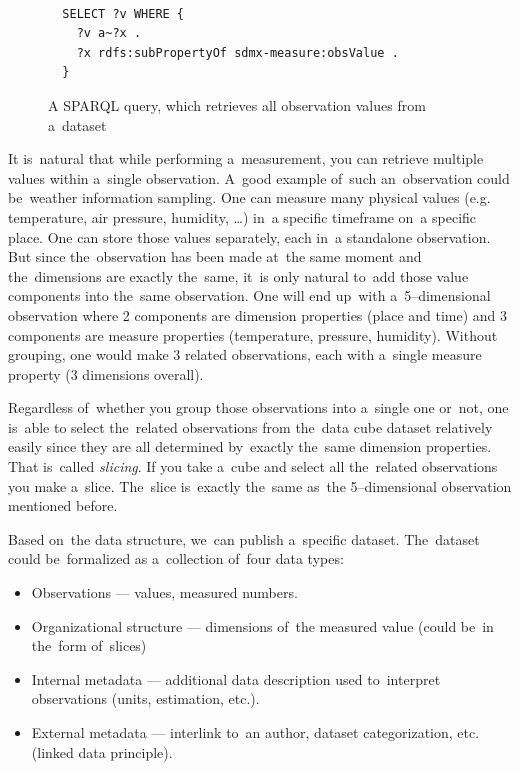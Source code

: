 \begin{figure}
\begin{verbatim}
  
  SELECT ?v WHERE {
    ?v a~?x .
    ?x rdfs:subPropertyOf sdmx-measure:obsValue .
  }

\end{verbatim}
\caption{A SPARQL query, which retrieves all observation values from a~dataset}
\label{fig:sparql-obsValue}
\end{figure}

It is~natural that while performing a~measurement, you can retrieve multiple
values within a~single observation. A~good example of~such an~observation could be~weather
information sampling. One can measure many physical values (e.g. temperature, air pressure,
humidity, …) in~a specific timeframe on~a specific place. One can store those values separately,
each in~a standalone observation. But since the~observation has been made at~the same moment
and the~dimensions are exactly the~same, it~is only natural to~add those value components into
the~same observation. One will end up~with a~5--dimensional observation where 2 components 
are dimension properties (place and time) and 3 components are measure properties
(temperature, pressure, humidity). Without grouping, one would make 3 related observations,
each with a~single measure property (3 dimensions overall).

Regardless of~whether you group those observations into a~single one or~not, one is~able
to select the~related observations from the~data cube dataset relatively easily since they
are all determined by~exactly the~same dimension properties. That is~called \emph{slicing}.
If you take a~cube and select all the~related observations you make a~slice. The~slice is~exactly
the~same as~the 5--dimensional observation mentioned before.

Based on~the data structure, we~can publish a~specific dataset. The~dataset could be~formalized
as a~collection of~four data types:

\begin{itemize}
\item Observations --- values, measured numbers.
\item Organizational structure --- dimensions of~the measured value (could be~in the~form of~slices)
\item Internal metadata --- additional data description used to~interpret observations (units, estimation,
etc.).
\item External metadata --- interlink to~an author, dataset categorization, etc. (linked data 
principle).
\end{itemize}

